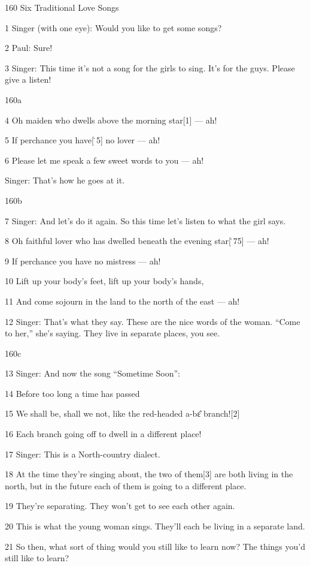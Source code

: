 
{160 Six Traditional Love Songs}

{1 Singer (with one eye): Would you like to get some songs?}

{2 Paul: Sure!}

{3 Singer: This time it's not a song for the girls to sing. It's for the
guys. Please give a listen!}

{160a}

{4 Oh maiden who dwells above the morning star[1] --- ah!}

{5 If perchance you have[\.5] no lover --- ah!}

{6 Please let me speak a few sweet words to you --- ah!}

{Singer: That's how he goes at it.}

{160b}

{7 Singer: And let's do it again. So this time let's listen to what the
girl says.}

{8 Oh faithful lover who has dwelled beneath the evening star[\.75] ---
ah!}

{9 If perchance you have no mistress --- ah!}

{10 Lift up your body's feet, lift up your body's hands,}

{11 And come sojourn in the land to the north of the east --- ah!}

{12 Singer: That's what they say. These are the nice words of the woman.
``Come to her,'' she's saying. They live in separate places, you see.}

{160c}

{13 Singer: And now the song ``Sometime Soon'':}

{14 Before too long a time has passed}

{15 We shall be, shall we not, like the red-headed a-bɛ̂ branch![2]}

{16 Each branch going off to dwell in a different place!}

{17 Singer: This is a North-country dialect.}

{18 At the time they're singing about, the two of them[3] are both living
in the north, but in the future each of them is going to a different place.}

{19 They're separating. They won't get to see each other again.}

{20 This is what the young woman sings. They'll each be living in a separate
land.}

{21 So then, what sort of thing would you still like to learn now? The things
you'd still like to learn?}

